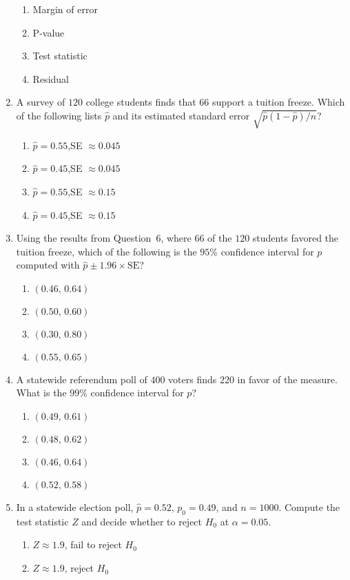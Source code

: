 \documentclass{article}
\begin{document}
\begin{enumerate}
\begin{enumerate}[label=(\Alph*)]
  \item Margin of error
  \item P-value
  \item Test statistic
  \item Residual
  \end{enumerate}
\item A survey of $120$ college students finds that $66$ support a tuition freeze. Which of the following lists $\hat{p}$ and its estimated standard error $\sqrt{\hat{p}(1-\hat{p})/n}$?
  \begin{enumerate}[label=(\Alph*)]
  \item $\hat{p}=0.55$,\quad SE $\approx0.045$
  \item $\hat{p}=0.45$,\quad SE $\approx0.045$
  \item $\hat{p}=0.55$,\quad SE $\approx0.15$
  \item $\hat{p}=0.45$,\quad SE $\approx0.15$
  \end{enumerate}
\item Using the results from Question~6, where $66$ of the $120$ students favored the tuition freeze, which of the following is the $95\%$ confidence interval for $p$ computed with $\hat{p}\pm1.96\times\text{SE}$?
  \begin{enumerate}[label=(\Alph*)]
  \item $(0.46,\,0.64)$
  \item $(0.50,\,0.60)$
  \item $(0.30,\,0.80)$
  \item $(0.55,\,0.65)$
  \end{enumerate}
\item A statewide referendum poll of $400$ voters finds $220$ in favor of the measure. What is the $99\%$ confidence interval for $p$?
  \begin{enumerate}[label=(\Alph*)]
  \item $(0.49,\,0.61)$
  \item $(0.48,\,0.62)$
  \item $(0.46,\,0.64)$
  \item $(0.52,\,0.58)$
  \end{enumerate}
\item In a statewide election poll, $\hat{p}=0.52$, $p_0=0.49$, and $n=1000$. Compute the test statistic $Z$ and decide whether to reject $H_0$ at $\alpha=0.05$.
  \begin{enumerate}[label=(\Alph*)]
  \item $Z\approx1.9$, fail to reject $H_0$
  \item $Z\approx1.9$, reject $H_0$

\end{enumerate}
\end{enumerate}
\end{document}
